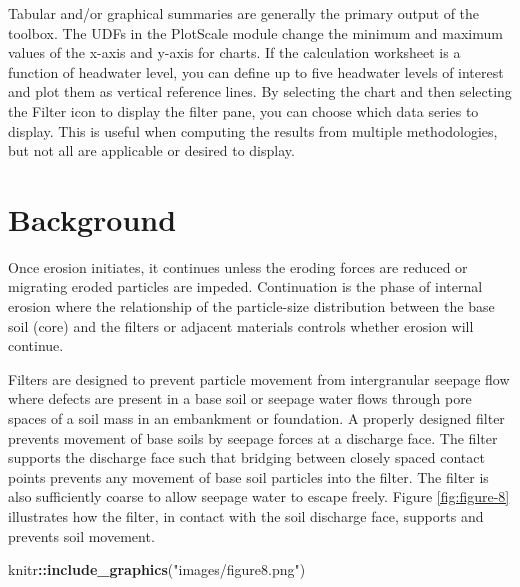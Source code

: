 \documentclass[
]{book}
\newenvironment{Shaded}{\begin{snugshade}}{\end{snugshade}}
\newcommand{\FunctionTok}[1]{\textcolor[rgb]{0.13,0.29,0.53}{\textbf{#1}}}
\newcommand{\NormalTok}[1]{#1}
\newcommand{\SpecialCharTok}[1]{\textcolor[rgb]{0.81,0.36,0.00}{\textbf{#1}}}
\newcommand{\StringTok}[1]{\textcolor[rgb]{0.31,0.60,0.02}{#1}}
\begin{document}
Tabular and/or graphical summaries are generally the primary output of the toolbox. The UDFs in the PlotScale module change the minimum and maximum values of the x-axis and y-axis for charts. If the calculation worksheet is a function of headwater level, you can define up to five headwater levels of interest and plot them as vertical reference lines. By selecting the chart and then selecting the Filter icon to display the filter pane, you can choose which data series to display. This is useful when computing the results from multiple methodologies, but not all are applicable or desired to display.

\chapter{Background}\label{background}

Once erosion initiates, it continues unless the eroding forces are reduced or migrating eroded particles are impeded. Continuation is the phase of internal erosion where the relationship of the particle-size distribution between the base soil (core) and the filters or adjacent materials controls whether erosion will continue.

Filters are designed to prevent particle movement from intergranular seepage flow where defects are present in a base soil or seepage water flows through pore spaces of a soil mass in an embankment or foundation. A properly designed filter prevents movement of base soils by seepage forces at a discharge face. The filter supports the discharge face such that bridging between closely spaced contact points prevents any movement of base soil particles into the filter. The filter is also sufficiently coarse to allow seepage water to escape freely. Figure \ref{fig:figure-8} illustrates how the filter, in contact with the soil discharge face, supports and prevents soil movement.

\begin{Shaded}
\begin{Highlighting}[]
\NormalTok{knitr}\SpecialCharTok{::}\FunctionTok{include\_graphics}\NormalTok{(}\StringTok{"images/figure8.png"}\NormalTok{)}
\end{Highlighting}
\end{Shaded}
\end{document}
